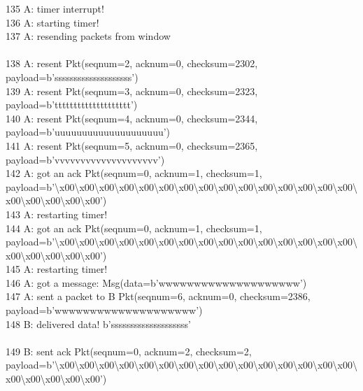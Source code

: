 \documentclass{article}
\begin{document}
{135 A: timer interrupt! \\
136 A: starting timer! \\
137 A: resending packets from window \\
 \\
138 A: resent Pkt(seqnum=2, acknum=0, checksum=2302,
payload=b'ssssssssssssssssssss') \\
139 A: resent Pkt(seqnum=3, acknum=0, checksum=2323,
payload=b'tttttttttttttttttttt') \\
140 A: resent Pkt(seqnum=4, acknum=0, checksum=2344,
payload=b'uuuuuuuuuuuuuuuuuuuu') \\
141 A: resent Pkt(seqnum=5, acknum=0, checksum=2365,
payload=b'vvvvvvvvvvvvvvvvvvvv') \\
142 A: got an ack Pkt(seqnum=0, acknum=1, checksum=1,
payload=b'\textbackslash{}x00\textbackslash{}x00\textbackslash{}x00\textbackslash{}x00\textbackslash{}x00\textbackslash{}x00\textbackslash{}x00\textbackslash{}x00\textbackslash{}x00\textbackslash{}x00\textbackslash{}x00\textbackslash{}x00\textbackslash{}x00\textbackslash{}x00\textbackslash{}x00\textbackslash{}x00\textbackslash{}x00\textbackslash{}x00\textbackslash{}x00\textbackslash{}x00')
\\
143 A: restarting timer! \\
144 A: got an ack Pkt(seqnum=0, acknum=1, checksum=1,
payload=b'\textbackslash{}x00\textbackslash{}x00\textbackslash{}x00\textbackslash{}x00\textbackslash{}x00\textbackslash{}x00\textbackslash{}x00\textbackslash{}x00\textbackslash{}x00\textbackslash{}x00\textbackslash{}x00\textbackslash{}x00\textbackslash{}x00\textbackslash{}x00\textbackslash{}x00\textbackslash{}x00\textbackslash{}x00\textbackslash{}x00\textbackslash{}x00\textbackslash{}x00')
\\
145 A: restarting timer! \\
146 A: got a message: Msg(data=b'wwwwwwwwwwwwwwwwwwww') \\
147 A: sent a packet to B Pkt(seqnum=6, acknum=0, checksum=2386,
payload=b'wwwwwwwwwwwwwwwwwwww') \\
148 B: delivered data! b'ssssssssssssssssssss' \\
 \\
149 B: sent ack Pkt(seqnum=0, acknum=2, checksum=2,
payload=b'\textbackslash{}x00\textbackslash{}x00\textbackslash{}x00\textbackslash{}x00\textbackslash{}x00\textbackslash{}x00\textbackslash{}x00\textbackslash{}x00\textbackslash{}x00\textbackslash{}x00\textbackslash{}x00\textbackslash{}x00\textbackslash{}x00\textbackslash{}x00\textbackslash{}x00\textbackslash{}x00\textbackslash{}x00\textbackslash{}x00\textbackslash{}x00\textbackslash{}x00')
}
\end{document}
